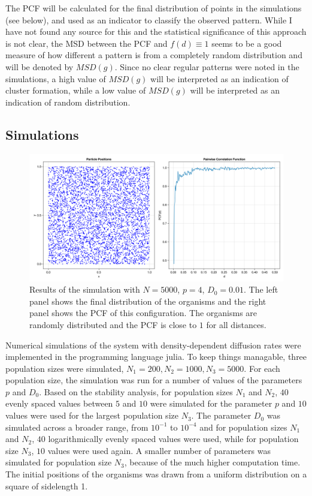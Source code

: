 \documentclass{article}
\begin{document}
The PCF will be calculated for the final distribution of points in the simulations (see below), and used as an indicator to classify the observed pattern.
While I have not found any source for this and the statistical significance of this approach is not clear, the MSD between the PCF and $f(d) \equiv 1$ seems to be a good measure of how different a pattern is from a completely random distribution and will be denoted by $MSD(g)$. 
Since no clear regular patterns were noted in the simulations, a high value of $MSD(g)$ will be interpreted as an indication of cluster formation, while a low value of $MSD(g)$ will be interpreted as an indication of random distribution.

\subsection{Simulations}
\begin{figure}
    \includegraphics[width=0.8\linewidth]{img/rp156_N5000_D01_p4.png}
    \caption{Results of the simulation with $N=5000$, $p=4$, $D_0=0.01$. The left panel shows the final distribution of the organisms and the right panel shows the PCF of this configuration. The organisms are randomly distributed and the PCF is close to $1$ for all distances.}
    \label{random}
\end{figure}
Numerical simulations of the system with density-dependent diffusion rates were implemented in the programming language julia.
To keep things managable, three population sizes were simulated, $N_1=200, N_2 = 1000, N_3 = 5000$.
For each population size, the simulation was run for a number of values of the parameters $p$ and $D_0$.
Based on the stability analysis, for population sizes $N_1$ and $N_2$, $40$ evenly spaced values between $5$ and $10$ were simulated for the parameter $p$ and $10$ values were used for the largest population size $N_3$.
The parameter $D_0$ was simulated across a broader range, from $10^{-1}$ to $10^{-4}$ and for population sizes $N_1$ and $N_2$, $40$ logarithmically evenly spaced values were used, while for population size $N_3$, $10$ values were used again.
A smaller number of parameters was simulated for population size $N_3$, because of the much higher computation time.
The initial positions of the organisms was drawn from a uniform distribution on a square of sidelength 1.
\end{document}
